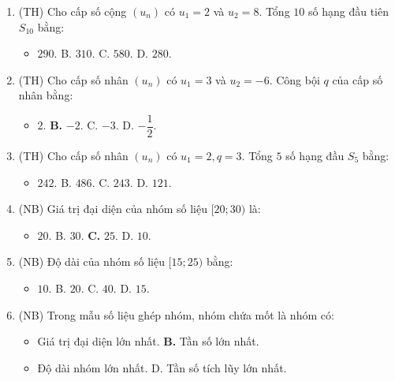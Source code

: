 \documentclass[12pt, a4paper]{article}
\begin{document}
\begin{enumerate}[leftmargin=0.6cm]
    \item (TH) Cho cấp số cộng $(u_n)$ có $u_1 = 2$ và $u_2 = 8$. Tổng $10$ số hạng đầu tiên $S_{10}$ bằng:
    \begin{itemize}[leftmargin=0.6cm]
        \item[\textbf{A.}] $290$. \quad B. $310$. \quad C. $580$. \quad D. $280$.
    \end{itemize}

    \item (TH) Cho cấp số nhân $(u_n)$ có $u_1 = 3$ và $u_2 = -6$. Công bội $q$ của cấp số nhân bằng:
    \begin{itemize}[leftmargin=0.6cm]
        \item[A.] $2$. \quad \textbf{B.} $-2$. \quad C. $-3$. \quad D. $-\dfrac{1}{2}$.
    \end{itemize}

    \item (TH) Cho cấp số nhân $(u_n)$ có $u_1 = 2, q = 3$. Tổng $5$ số hạng đầu $S_5$ bằng:
    \begin{itemize}[leftmargin=0.6cm]
        \item[\textbf{A.}] $242$. \quad B. $486$. \quad C. $243$. \quad D. $121$.
    \end{itemize}

    \item (NB) Giá trị đại diện của nhóm số liệu $[20; 30)$ là:
    \begin{itemize}[leftmargin=0.6cm]
        \item[A.] $20$. \quad B. $30$. \quad \textbf{C.} $25$. \quad D. $10$.
    \end{itemize}

    \item (NB) Độ dài của nhóm số liệu $[15; 25)$ bằng:
    \begin{itemize}[leftmargin=0.6cm]
        \item[\textbf{A.}] $10$. \quad B. $20$. \quad C. $40$. \quad D. $15$.
    \end{itemize}

    \item (NB) Trong mẫu số liệu ghép nhóm, nhóm chứa mốt là nhóm có:
    \begin{itemize}[leftmargin=0.6cm]
        \item[A.] Giá trị đại diện lớn nhất. \quad \textbf{B.} Tần số lớn nhất.
        \item[C.] Độ dài nhóm lớn nhất. \quad D. Tần số tích lũy lớn nhất.
    \end{itemize}


\end{enumerate}
\end{document}
